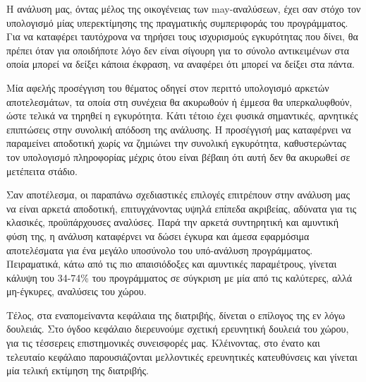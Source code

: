 Η ανάλυση μας, όντας μέλος της οικογένειας των {\en may}-αναλύσεων, έχει σαν στόχο τον υπολογισμό μίας υπερεκτίμησης της πραγματικής συμπεριφοράς του προγράμματος. Για να καταφέρει ταυτόχρονα να τηρήσει τους ισχυρισμούς εγκυρότητας που δίνει, θα πρέπει όταν για οποιδήποτε λόγο δεν είναι σίγουρη για το σύνολο αντικειμένων στα οποία μπορεί να δείξει κάποια έκφραση, να αναφέρει ότι μπορεί να δείξει στα πάντα.

Μία αφελής προσέγγιση του θέματος οδηγεί στον περιττό υπολογισμό αρκετών αποτελεσμάτων, τα οποία στη συνέχεια θα ακυρωθούν ή έμμεσα θα υπερκαλυφθούν, ώστε τελικά να τηρηθεί η εγκυρότητα. Κάτι τέτοιο έχει φυσικά σημαντικές, αρνητικές επιπτώσεις στην συνολική απόδοση της ανάλυσης. Η προσέγγισή μας καταφέρνει να παραμείνει αποδοτική χωρίς να ζημιώνει την συνολική εγκυρότητα, καθυστερώντας τον υπολογισμό πληροφορίας μέχρις ότου είναι βέβαιη ότι αυτή δεν θα ακυρωθεί σε μετέπειτα στάδιο.

Σαν αποτέλεσμα, οι παραπάνω σχεδιαστικές επιλογές επιτρέπουν στην ανάλυση μας να είναι αρκετά αποδοτική, επιτυγχάνοντας υψηλά επίπεδα ακριβείας, αδύνατα για τις κλασικές, προϋπάρχουσες αναλύσες. Παρά την αρκετά συντηρητική και αμυντική φύση της, η ανάλυση καταφέρνει να δώσει έγκυρα και άμεσα εφαρμόσιμα αποτελέσματα για ένα μεγάλο υποσύνολο του υπό-ανάλυση προγράμματος. Πειραματικά, κάτω από τις πιο απαισιόδοξες και αμυντικές παραμέτρους, γίνεται κάλυψη του 34-74\% του προγράμματος σε σύγκριση με μία από τις καλύτερες, αλλά μη-έγκυρες, αναλύσεις του χώρου.


\vspace{5 mm}
Τέλος, στα εναπομείναντα κεφάλαια της διατριβής, δίνεται ο επίλογος της εν λόγω δουλειάς. Στο όγδοο κεφάλαιο διερευνούμε σχετική ερευνητική δουλειά του χώρου, για τις τέσσερεις επιστημονικές συνεισφορές μας. Κλέινοντας, στο ένατο και τελευταίο κεφάλαιο παρουσιάζονται μελλοντικές ερευνητικές κατευθύνσεις και γίνεται μία τελική εκτίμηση της διατριβής.